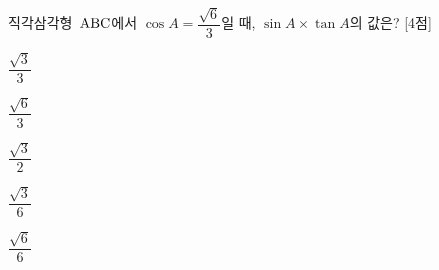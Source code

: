 직각삼각형~$\mathrm{ABC}$에서 $\cos A=\dfrac{\sqrt{6}}{3}$일 때, $\sin A\times\tan A$의 값은? \mbox{[4점]}
\begin{choices32}{\rule[-3ex]{0pt}{8ex}$\dfrac{\sqrt{3}}{3}$}{\rule[-3ex]{0pt}{8ex}$\dfrac{\sqrt{6}}{3}$}{\rule[-3ex]{0pt}{8ex}$\dfrac{\sqrt{3}}{2}$}{\rule[-3ex]{0pt}{8ex}$\dfrac{\sqrt{3}}{6}$}{\rule[-3ex]{0pt}{8ex}$\dfrac{\sqrt{6}}{6}$}\end{choices32}
